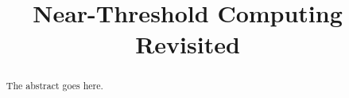 \documentclass[conference]{IEEEtran}
\begin{document}
\title{Near-Threshold Computing Revisited}

\author{}

\maketitle


\begin{abstract}
The abstract goes here.
\end{abstract}








\end{document}
